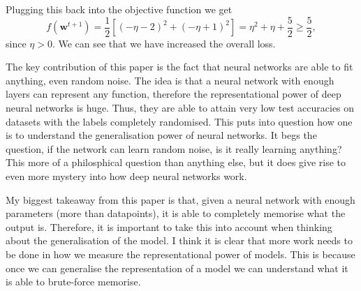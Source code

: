 \documentclass[twoside]{article}
\begin{document}
Plugging this back into the objective function we get 
\begin{equation*}
    f(\bm{w}^{t+1}) = \frac{1}{2}[(-\eta - 2)^{2} + (-\eta + 1)^{2}]
    = \eta^{2} + \eta + \frac{5}{2} \geq \frac{5}{2},
\end{equation*}
since $\eta > 0$. We can see that we have increased the overall loss.


The key contribution of this paper is the fact that neural networks are able to fit anything,
even random noise. The idea is that a neural network with enough layers can represent any function,
therefore the representational power of deep neural networks is huge. Thus, they are able to attain
very low test accuracies on datasets with the labels completely randomised. This puts into question
how one is to understand the generalisation power of neural networks. It begs the question,
if the network can learn random noise, is it really learning anything? This more of a philosphical
question than anything else, but it does give rise to even more mystery into how deep neural networks
work.

My biggest takeaway from this paper is that, given a neural network with enough parameters (more than 
datapoints), it is able to completely memorise what the output is. Therefore, it is important to take 
this into account when thinking about the generalisation of the model. I think it is clear that more work
needs to be done in how we measure the representational power of models. This is because once we can 
generalise the representation of a model we can understand what it is able to brute-force memorise.
\end{document}
